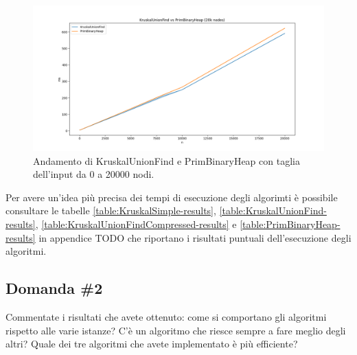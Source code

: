 \begin{figure}[H]
    \centering
    \includegraphics[width=1.0\textwidth]{./images/KruskalUnionFind_vs_PrimBinaryHeap_(20k_nodes).png}
    \caption{Andamento di KruskalUnionFind e PrimBinaryHeap con taglia dell'input da 0 a 20000 nodi.}
    \label{fig:TheTwoComparison5k}
\end{figure}

\noindent Per avere un'idea più precisa dei tempi di esecuzione degli 
algorimti è possibile consultare le tabelle \ref{table:KruskalSimple-results},
 \ref{table:KruskalUnionFind-results}, \ref{table:KruskalUnionFindCompressed-results} 
 e \ref{table:PrimBinaryHeap-results} in appendice TODO che riportano i risultati puntuali 
 dell'esecuzione degli algoritmi.

\subsection{Domanda \#2}

\begin{displayquote}
Commentate i risultati che avete ottenuto: come si comportano gli algoritmi rispetto alle varie istanze? C'è un algoritmo che riesce sempre a fare meglio degli altri? Quale dei tre algoritmi che avete implementato è più efficiente?
\end{displayquote}



